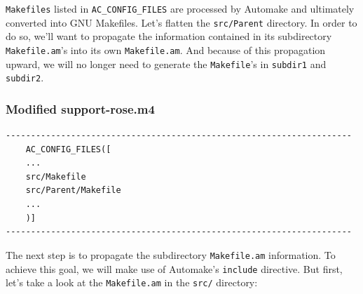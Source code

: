 \texttt{Makefiles} listed in \texttt{AC\_CONFIG\_FILES} are processed by Automake and
ultimately converted into GNU Makefiles.
\newline\newline
Let's flatten the \texttt{src/Parent} directory. In order to do so, we'll want to propagate
the information contained in its subdirectory \texttt{Makefile.am}'s into
its own \texttt{Makefile.am}. And because of this propagation upward, we will no longer
need to generate the \texttt{Makefile}'s in \texttt{subdir1} and \texttt{subdir2}.
\subsubsection{Modified support-rose.m4}
    \begin{verbatim}
---------------------------------------------------------------------
    AC_CONFIG_FILES([
    ...
    src/Makefile
    src/Parent/Makefile
    ...
    )]
---------------------------------------------------------------------
\end{verbatim}

The next step is to propagate the subdirectory \texttt{Makefile.am} information. To achieve
this goal, we will make use of Automake's \texttt{include} directive. But first, let's take
a look at the \texttt{Makefile.am} in the \texttt{src/} directory:


